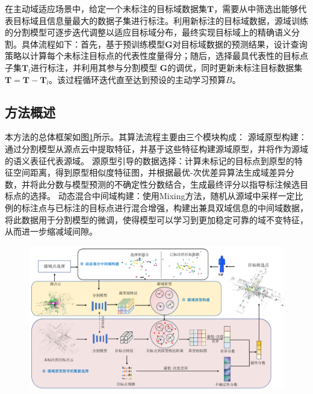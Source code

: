 在主动域适应场景中，给定一个未标注的目标域数据集$\mathbf{T}$，需要从中筛选出能够代表目标域且信息量最大的数据子集进行标注。利用新标注的目标域数据，源域训练的分割模型可逐步迭代调整以适应目标域分布，最终实现目标域上的精确语义分割。具体流程如下：首先，基于预训练模型$\mathbf{G}$对目标域数据的预测结果，设计查询策略以计算每个未标注目标点的代表性度量得分；随后，选择最具代表性的目标点子集\(\mathbf{T}_l\)进行标注，并利用其参与分割模型 $\mathbf{G}$的调优，同时更新未标注目标数据集\(\mathbf{T}=\mathbf{T}-\mathbf{T}_l\)。该过程循环迭代直至达到预设的主动学习预算$B$。 
\subsection{方法概述}
本方法的总体框架如图\ref{fig:framework-3}所示。其算法流程主要由三个模块构成：
源域原型构建：通过分割模型从源点云中提取特征，并基于这些特征构建源域原型，并将作为源域的语义表征代表源域。
源原型引导的数据选择：计算未标记的目标点到原型的特征空间距离，得到原型相似度特征图，并根据最优-次优差异算法生成域差异分数，并将此分数与模型预测的不确定性分数结合，生成最终评分以指导标注候选目标点的选择。
动态混合中间域构建：使用Mixing方法，随机从源域中采样一定比例的标注点与已标注的目标点进行混合增强，构建出兼具双域信息的中间域数据，将此数据用于分割模型的微调，使得模型可以学习到更加稳定可靠的域不变特征，从而进一步缩减域间隙。

\vspace{-0.1cm}
\begin{figure}[h]
    \centering
    \includegraphics[width = \textwidth]{ljx/figure/3-1.pdf}
    \label{fig:framework-3}
\end{figure}
\vspace{-0.35cm}
